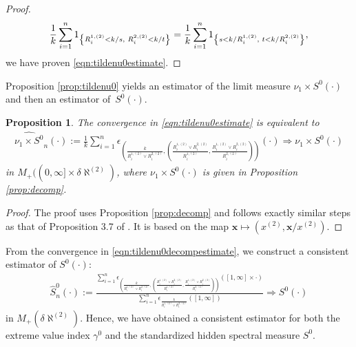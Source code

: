 \documentclass[11 pt]{amsart}
\newtheorem{prop}[thm]{Proposition}
\numberwithin{equation}{section}
\begin{document}
{{\begin{proof}
\begin{align*}
  
\frac{1}{k} \sum_{i=1}^n 1_{\left \{ R^{1, (2)}_i <
     k/s, \hskip 0.1 cm R^{2, (2)}_i < k/t \right \} } 
= \frac{1}{k} \sum_{i=1}^n 1_{\left \{ s <  k/R^{1, (2)}_i, \hskip 0.1 cm t < k/R^{2, (2)}_i \right \} },
 \end{align*} we have proven \eqref{eqn:tildenu0estimate}.
\end{proof}

Proposition  \ref{prop:tildenu0}  yields an estimator of the limit measure $\nu_1 \times
S^0(\cdot)$ and then an estimator of~$S^0(\cdot)$.

\begin{prop}\label{prop:spectralestimation_smallcone}
{{ The convergence in \eqref{eqn:tildenu0estimate} is equivalent to 
\begin{align}\label{eqn:tildenu0decompestimate}
\widehat{\nu_1 \times  S^0}_n(\cdot) :=
\frac{1}{k} \sum_{i=1}^n \epsilon_{\left(\frac{k}{R^{1, (2)}_i \vee
      R^{2, (2)}_i} , \left(\frac{R^{1, (2)}_i \vee R^{2,
          (2)}_i}{R^{1, (2)}_i}, \frac{R^{1, (2)}_i \vee R^{2,
          (2)}_i}{R^{2, (2)}_i} \right) \right)}(\cdot) \Rightarrow
\nu_1 \times  S^0(\cdot) 
\end{align}
in $M_+((0, \infty] \times \delta \aleph^{(2)})$, where $\nu_1 \times  S^0(\cdot)$ is given in Proposition \ref{prop:decomp}.
}}
\end{prop}

\begin{proof}
The proof uses Proposition \ref{prop:decomp} and follows exactly
similar steps as that of Proposition 3.7 of
\cite{mitra:resnick:2010a}. {It is based on the map ${\boldsymbol x} \mapsto
(x^{(2)}, {\boldsymbol x}/x^{(2)})$.}
\end{proof}

From the convergence in \eqref{eqn:tildenu0decompestimate}, we
construct a consistent estimator of $S^0(\cdot)$:  
\begin{align}\label{eqn:s0pestimate}
\hat{S}_n^0(\cdot) :=
\frac{ \sum_{i=1}^n \epsilon_{\left(\frac{k}{R^{1, (2)}_i \vee R^{2,
          (2)}_i} , \left(\frac{R^{1, (2)}_i \vee R^{2, (2)}_i}{R^{1,
            (2)}_i}, \frac{R^{1, (2)}_i \vee R^{2, (2)}_i}{R^{2,
            (2)}_i} \right) \right)} \left([1, \infty] \times \cdot
  \right)}{\sum_{i=1}^n \epsilon_{\frac{k}{R^{1, (2)}_i \vee R^{2,
        (2)}_i} }([1, \infty])} \Rightarrow S^0(\cdot) 
\end{align}
in $M_+(\delta \aleph^{(2)})$. Hence, we have obtained a consistent estimator for both the extreme value index $\gamma^0$ and the standardized hidden spectral measure $S^0$.

}}
\end{document}
